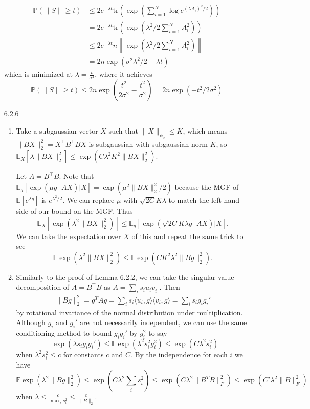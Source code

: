 \documentclass[11pt]{article}
\def\Pp{\mathbb P}
\def\E{\mathbb E}
\newcommand{\bracks}[2]{\ensuremath{\langle #1, #2\rangle}}
\begin{document}
\begin{enumerate}
\begin{align*}
	\Pp (\| S \| \geq t) &\leq 2e^{-\lambda t} \text{tr}\left(\exp\left( \sum_{i=1}^{N} \log e^{(\lambda A_i)^2/2} \right)\right)\\
	&=2e^{-\lambda t} \text{tr}\left(\exp\left( \lambda^2/2 \sum_{i=1}^{N} A_i^2 \right)\right)\\
	&\leq 2e^{-\lambda t} n\left\|\exp\left( \lambda^2/2 \sum_{i=1}^{N} A_i^2 \right)\right\|\\
	&= 2n\exp\left(  \sigma^2 \lambda^2/2-\lambda t \right)
\end{align*}
which is minimized at $ \lambda = \frac{t}{\sigma^2} $, where it achieves
\[ \Pp (\| S \| \geq t) \leq 2n\exp\left( \frac{t^2}{2\sigma^2}-\frac{t^2}{\sigma^2} \right) = 2n\exp(-t^2/2\sigma^2) \]

\item[6.2.6]\begin{enumerate}
	\item Take a subgaussian vector $ X $ such that $ \| X\|_{\psi_2} \leq K $, which means $ \|BX\|_2^2 = X^\top B^\top B X $ is subgaussian with subgaussian norm $ K $, so $ \E_X[\lambda \| BX \|_2^2]\leq \exp(C\lambda^2K^2\|BX\|_2^2) $.
	
	Let $ A=B^\top B $. Note that $ \E_g[\exp(\mu g^\top A X ) | X] = \exp(\mu^2 \|BX\|_2^2/2) $ because the MGF of $ \E[e^{\lambda g}] $ is $ e^{\lambda^2/2} $. We can replace $ \mu $ with $ \sqrt{2C}K\lambda $ to match the left hand side of our bound on the MGF. Thus
	\[ \E_X[\exp(\lambda^2 \|BX\|_2^2)] \leq \E_g[\exp(\sqrt{2C}K\lambda g^\top A X ) | X]. \]
	We can take the expectation over $ X $ of this and repeat the same trick to see
	\[ \E \exp(\lambda^2\|BX \|_2^2) \leq \E \exp (CK^2 \lambda^2 \|Bg\|_2^2). \]
	
	
	\item Similarly to the proof of Lemma 6.2.2, we can take the singular value decomposition of $ A=B^\top B $ as $ A=\sum_{i} s_i u_i v_i^\top $. Then 
	\begin{align*}
		\|Bg\|_2^2 = g^TAg = \sum_{i} s_i\bracks{u_i}{g} \bracks{v_i}{g} = \sum_{i} s_i g_i g_i'
	\end{align*}
	by rotational invariance of the normal distribution under multiplication. Although $ g_i $ and $ g_i' $ are not necessarily independent, we can use the same conditioning method to bound $ g_ig_i' $ by $ g_i^2 $ to say 
	\[ \E \exp(\lambda s_i g_i g_i') \leq \E \exp(\lambda^2 s_i^2 g_i^2) \leq \exp(C\lambda^2s_i^2) \]
	when $ \lambda^2 s_i^2 \leq c $ for constants $ c $ and $ C $. By the independence for each $ i $ we have
	\[ \E \exp(\lambda^2\|Bg \|_2^2) \leq \exp \left(C\lambda^2 \sum_{i} s_i^2 \right) \leq \exp \left(C\lambda^2 \| B^TB \|_F^2 \right) \leq \exp \left(C'\lambda^2 \| B \|_F^2 \right) \]
	when $ \lambda \leq \frac{c}{\max_i s_i^2} \leq \frac{c}{\|B\|_2} $.
	

\end{enumerate}
\end{enumerate}
\end{document}

